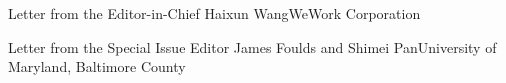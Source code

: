 \documentclass[11pt]{article}
\begin{document}


\begin{bulletin}


%
%

\begin{lettersection}


\begin{letter}{Letter from the Editor-in-Chief}
{Haixun Wang}{WeWork Corporation}

\end{letter}
%
\newpage
%
%
\begin{letter}{Letter from the Special Issue Editor}
{James Foulds and Shimei Pan}{University of Maryland, Baltimore County}


\end{letter}

\end{lettersection}


%


\end{bulletin}
\end{document}
